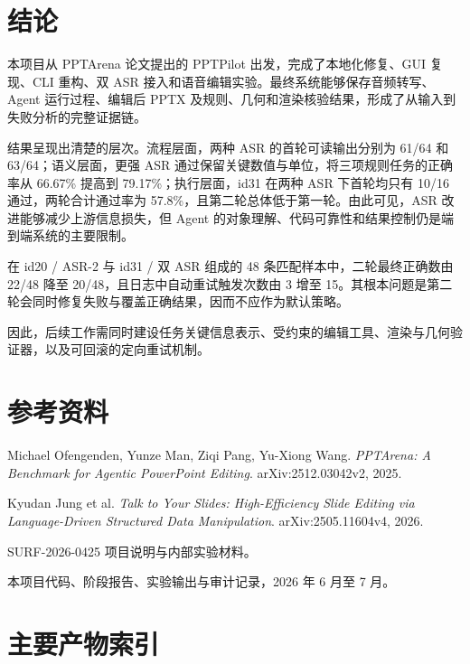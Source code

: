 \documentclass[11pt,a4paper,UTF8,fontset=fandol]{ctexart}
\begin{document}
\section{结论}

本项目从 PPTArena 论文提出的 PPTPilot 出发，完成了本地化修复、GUI 复现、CLI 重构、双 ASR 接入和语音编辑实验。最终系统能够保存音频转写、Agent 运行过程、编辑后 PPTX 及规则、几何和渲染核验结果，形成了从输入到失败分析的完整证据链。

结果呈现出清楚的层次。流程层面，两种 ASR 的首轮可读输出分别为 61/64 和 63/64；语义层面，更强 ASR 通过保留关键数值与单位，将三项规则任务的正确率从 66.67\% 提高到 79.17\%；执行层面，id31 在两种 ASR 下首轮均只有 10/16 通过，两轮合计通过率为 57.8\%，且第二轮总体低于第一轮。由此可见，ASR 改进能够减少上游信息损失，但 Agent 的对象理解、代码可靠性和结果控制仍是端到端系统的主要限制。

在 id20 / ASR-2 与 id31 / 双 ASR 组成的 48 条匹配样本中，二轮最终正确数由 22/48 降至 20/48，且日志中自动重试触发次数由 3 增至 15。其根本问题是第二轮会同时修复失败与覆盖正确结果，因而不应作为默认策略。

因此，后续工作需同时建设任务关键信息表示、受约束的编辑工具、渲染与几何验证器，以及可回滚的定向重试机制。

\section*{参考资料}

\begin{enumerate}[label={[\arabic*]},leftmargin=2.5em]
  \item Michael Ofengenden, Yunze Man, Ziqi Pang, Yu-Xiong Wang. \textit{PPTArena: A Benchmark for Agentic PowerPoint Editing}. arXiv:2512.03042v2, 2025.
  \item Kyudan Jung et al. \textit{Talk to Your Slides: High-Efficiency Slide Editing via Language-Driven Structured Data Manipulation}. arXiv:2505.11604v4, 2026.
  \item SURF-2026-0425 项目说明与内部实验材料。
  \item 本项目代码、阶段报告、实验输出与审计记录，2026 年 6 月至 7 月。
\end{enumerate}

\appendix
\section{主要产物索引}
\end{document}
